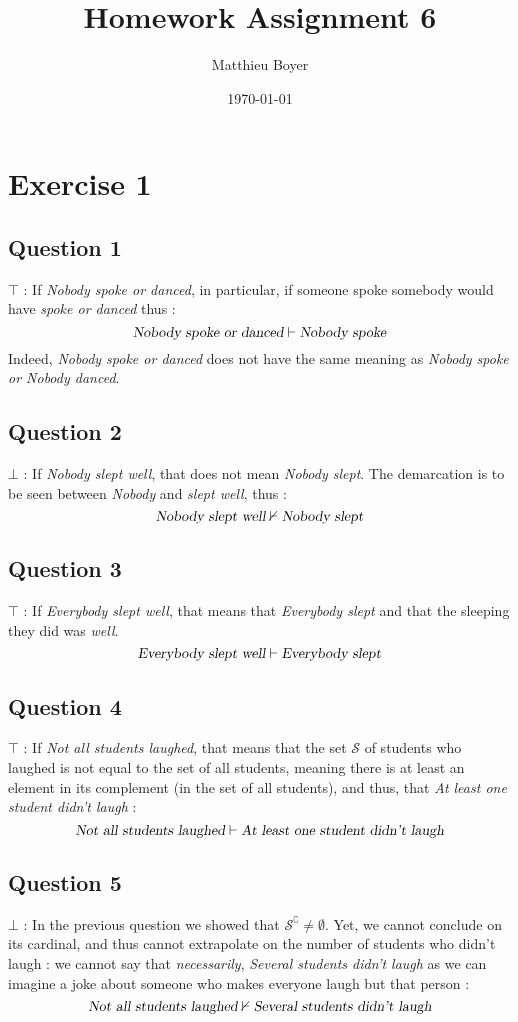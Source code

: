 \documentclass{cours}
\title{Homework Assignment 6}
\date{\today}
\author{Matthieu Boyer}
\begin{document}
    \section{Exercise 1}
        \subsection{Question 1}
        $\top$ : If \textsl{Nobody spoke or danced}, in particular, if someone spoke somebody would have \textsl{spoke or danced} thus : 
        \[
            \textsl{Nobody spoke or danced} \vdash \textsl{Nobody spoke}
        \]  
        Indeed, \textsl{Nobody spoke or danced} does not have the same meaning as \textsl{Nobody spoke or Nobody danced}.

        \subsection{Question 2}
        $\bot$ : If \textsl{Nobody slept well}, that does not mean \textsl{Nobody slept}. The demarcation is to be seen between \textsl{Nobody} and \textsl{slept well}, thus :
        \[
            \textsl{Nobody slept well} \nvdash \textsl{Nobody slept}
        \]

        \subsection{Question 3}
        $\top$ : If \textsl{Everybody slept well}, that means that \textsl{Everybody slept} and that the sleeping they did was \textsl{well}.
        \[
            \textsl{Everybody slept well} \vdash \textsl{Everybody slept}
        \]

        \subsection{Question 4}
        $\top$ : If \textsl{Not all students laughed}, that means that the set $\mathscr{S}$ of students who laughed is not equal to the set of all students, meaning there is at least an element in its complement (in the set of all students), and thus, that \textsl{At least one student didn't laugh} :
        \[
            \textsl{Not all students laughed} \vdash \textsl{At least one student didn't laugh}
        \]

        \subsection{Question 5}
        $\bot$ : In the previous question we showed that $\mathscr{S}^{\complement} \neq \emptyset$. Yet, we cannot conclude on its cardinal, and thus cannot extrapolate on the number of students who didn't laugh : we cannot say that \emph{necessarily}, \textsl{Several students didn't laugh} as we can imagine a joke about someone who makes everyone laugh but that person :
        \[
            \textsl{Not all students laughed}  \nvdash \textsl{Several students didn't laugh}
        \]
\end{document}
